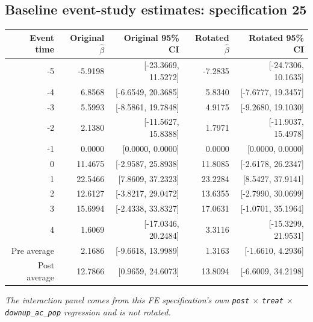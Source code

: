 \documentclass[10pt]{article}
\begin{document}
\subsection*{Baseline event-study estimates: specification 25}
\begin{center}
\scriptsize
\begin{tabular}{r rr rr}
\toprule
Event time & Original $\hat\beta$ & Original 95\% CI & Rotated $\hat\beta$ & Rotated 95\% CI \\
\midrule
-5 & -5.9198 & [-23.3669, 11.5272] & -7.2835 & [-24.7306, 10.1635] \\
-4 & 6.8568 & [-6.6549, 20.3685] & 5.8340 & [-7.6777, 19.3457] \\
-3 & 5.5993 & [-8.5861, 19.7848] & 4.9175 & [-9.2680, 19.1030] \\
-2 & 2.1380 & [-11.5627, 15.8388] & 1.7971 & [-11.9037, 15.4978] \\
-1 & 0.0000 & [0.0000, 0.0000] & 0.0000 & [0.0000, 0.0000] \\
0 & 11.4675 & [-2.9587, 25.8938] & 11.8085 & [-2.6178, 26.2347] \\
1 & 22.5466 & [7.8609, 37.2323] & 23.2284 & [8.5427, 37.9141] \\
2 & 12.6127 & [-3.8217, 29.0472] & 13.6355 & [-2.7990, 30.0699] \\
3 & 15.6994 & [-2.4338, 33.8327] & 17.0631 & [-1.0701, 35.1964] \\
4 & 1.6069 & [-17.0346, 20.2484] & 3.3116 & [-15.3299, 21.9531] \\
\midrule
Pre average & 2.1686 & [-9.6618, 13.9989] & 1.3163 & [-1.6610, 4.2936] \\
Post average & 12.7866 & [0.9659, 24.6073] & 13.8094 & [-6.6009, 34.2198] \\
\bottomrule
\end{tabular}
\end{center}
\medskip
\textit{The interaction panel comes from this FE specification's own \texttt{post} $\times$ \texttt{treat} $\times$ \texttt{downup\_ac\_pop} regression and is not rotated.}
\clearpage
\end{document}

